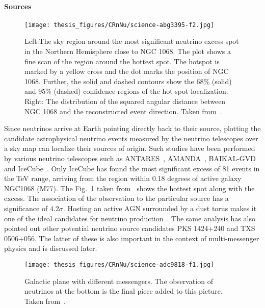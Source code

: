   \paragraph*{Sources}
  \label{subsubsec:Nusources}
  \begin{figure}[t!]
    \centering
    \texttt{[image: thesis\_figures/CRnNu/science-abg3395-f2.jpg]}
    \caption{Left:The sky region around the most significant neutrino excess spot in the Northern Hemisphere close to NGC 1068. The plot shows a fine scan of the region around the hottest spot. The hotspot is marked by a yellow cross and the dot marks the position of NGC 1068. Further, 
    the solid and dashed contours show the 68\% (solid) and 95\% (dashed) confidence regions of
    the hot spot localization. Right: The distribution of the squared angular distance between NGC 1068 and the reconstructed event direction. Taken from~\cite{Icecube_2022}.}
    \label{fig:NGC1068_excess}
  \end{figure}

  Since neutrinos arrive at Earth pointing directly back to their source, plotting the candidate astrophysical neutrino events measured by the neutrino telescopes over a sky map can localize their sources of origin. Such studies have been performed by various neutrino telescopes such as ANTARES~\cite{Albert_2021}, AMANDA~\cite{Abbasi_2009_Amanda}, BAIKAL-GVD~\cite{Allakhverdyan_2023} and IceCube~\cite{Icecube_2022}. Only IceCube has found the most significant excess of 81 events in the TeV range, arriving from the region within 0.18 degrees of active galaxy NGC1068 (M77). The Fig.~\ref{fig:NGC1068_excess} taken from~\cite{Icecube_2022} shows the hottest spot along with the excess. The association of the observation to the particular source has a significance of $4.2\sigma$. Hosting an active AGN surrounded by a dust torus makes it one of the ideal candidates for neutrino production~\cite{eichler1979high,berezinsky1981high}. The same analysis has also pointed out other potential neutrino source candidates PKS 1424+240 and TXS 0506+056. The latter of these is also important in the context of multi-messenger physics and is discussed later. 

  \begin{figure}[t!]
    \centering
    \texttt{[image: thesis\_figures/CRnNu/science-adc9818-f1.jpg]}
    \caption{Galactic plane with different messengers. The observation of neutrinos at the bottom is the final piece added to this picture. Taken from~\cite{Galactic_plane_nu_2023}.}
    \label{fig:Galactic_plane_nu_messengers}
  \end{figure}

